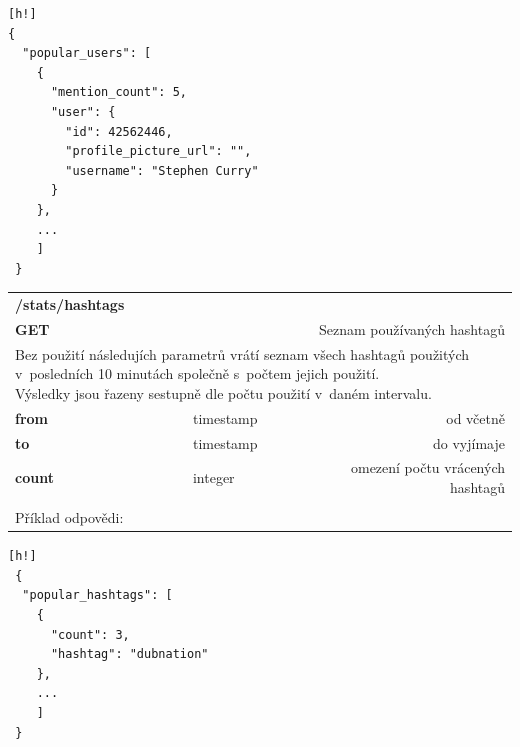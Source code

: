 \documentclass[thesis=B,czech]{FITthesis}[2012/06/26]
\begin{document}
\begin{lstlisting}[nolol=true][h!]
{
  "popular_users": [
    {
      "mention_count": 5,
      "user": {
        "id": 42562446,
        "profile_picture_url": "",
        "username": "Stephen Curry"
      }
    },
    ...
    ]
 }
\end{lstlisting} 

\begin{table}[h]
\begin{tabular}{llllr}
\rowcolor[HTML]{EFEFEF}
\large \textbf{/stats/hashtags}        &         &                 &        & \multicolumn{1}{l}{}                \\
\rowcolor[HTML]{EFEFEF}
\textbf{GET}          &         &                 &        & Seznam používaných hashtagů                        \\
\multicolumn{5}{l}{\parbox[t]{12.8cm}{Bez použití následujích parametrů vrátí seznam všech hashtagů použitých v~posledních 10 minutách společně s~počtem jejich použití. \\ Výsledky jsou řazeny sestupně dle počtu použití v~daném intervalu. }  } \\
\textbf{from}         &         & timestamp       &        & od včetně                           \\
\textbf{to}           &         & timestamp       &        & do vyjímaje                         \\
\textbf{count}        &         & integer         &        & omezení počtu vrácených hashtagů     \\
 & & & & \\
 Příklad odpovědi: 
\end{tabular}
\end{table}

\begin{lstlisting}[nolol=true][h!]
 {
  "popular_hashtags": [
    {
      "count": 3,
      "hashtag": "dubnation"
    },
    ...
    ]
 }
\end{lstlisting} 
\end{document}
